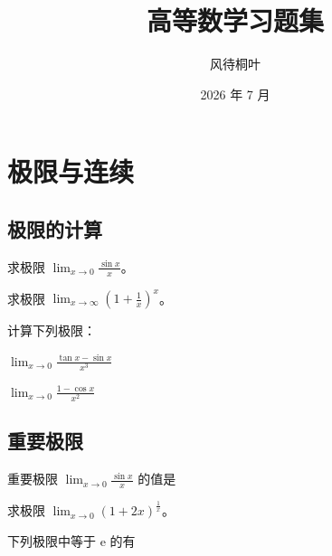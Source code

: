\documentclass[answersection,pad]{kiritex}
\title{高等数学习题集}
\author{风待桐叶}
\date{2026 年 7 月}
\begin{document}
\maketitle

\tableofcontents
\newpage

\section{极限与连续}

\subsection{极限的计算}

\begin{problem}
  求极限 $\displaystyle\lim_{x\to 0}\frac{\sin x}{x}$。
\end{problem}

\begin{problem}
  求极限 $\displaystyle\lim_{x\to\infty}\left(1+\frac{1}{x}\right)^x$。
\end{problem}

\begin{problem}
  计算下列极限：
  \begin{problemsubparts}
    \item $\displaystyle\lim_{x\to 0}\frac{\tan x-\sin x}{x^3}$
    \item $\displaystyle\lim_{x\to 0}\frac{1-\cos x}{x^2}$
  \end{problemsubparts}
\end{problem}

\subsection{重要极限}

\begin{problem}
  重要极限 $\displaystyle\lim_{x\to 0}\frac{\sin x}{x}$ 的值是 \problemblock*
\end{problem}

\begin{problem}
  求极限 $\displaystyle\lim_{x\to 0}(1+2x)^{\frac{1}{x}}$。
\end{problem}

\begin{problemchoice}
  下列极限中等于 $\mathrm{e}$ 的有
\end{problemchoice}
\end{document}
